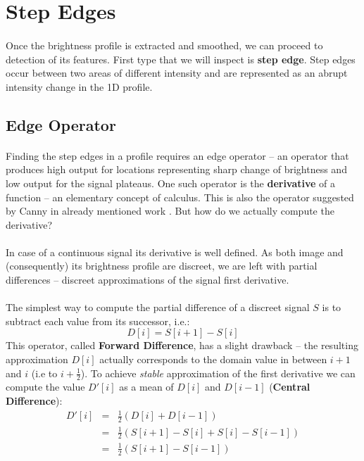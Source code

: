 \section{Step Edges}

\paragraph*{}
Once the brightness profile is extracted and smoothed, we can proceed to detection of its features. First type that we will inspect is \textbf{step edge}. Step edges occur between two areas of different intensity and are represented as an abrupt intensity change in the 1D profile.

\subsection{Edge Operator}

\paragraph*{}
Finding the step edges in a profile requires an edge operator -- an operator that produces high output for locations representing sharp change of brightness and low output for the signal plateaus. One such operator is the \textbf{derivative} of a function -- an elementary concept of calculus. This is also the operator suggested by Canny in already mentioned work \cite{Canny86}. But how do we actually compute the derivative? 

\paragraph*{}
In case of a continuous signal its derivative is well defined. As both image and (consequently) its brightness profile are discreet, we are left with partial differences -- discreet approximations of the signal first derivative.

\paragraph*{}
The simplest way to compute the partial difference of a discreet signal $S$ is to subtract each value from its successor, i.e.:
\[
	D[i] = S[i+1]-S[i]
\]  
This operator, called \textbf{Forward Difference}, has a slight drawback -- the resulting approximation $D[i]$ actually corresponds to the domain value in between $i+1$ and $i$ (i.e to $i+\frac{1}{2}$). To achieve \textit{stable} approximation of the first derivative we can compute the value $D'[i]$ as a mean of $D[i]$ and $D[i-1]$ (\textbf{Central Difference}):
\begin{eqnarray*}
D'[i] & = & \frac{1}{2}(D[i]+D[i-1]) \\
	& = & \frac{1}{2}(S[i+1]-S[i]+S[i]-S[i-1]) \\
	& = & \frac{1}{2}(S[i+1]-S[i-1])
\end{eqnarray*}

